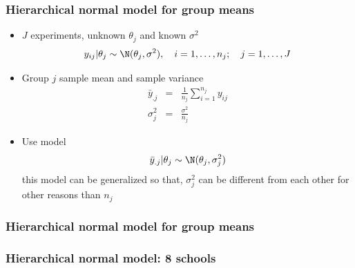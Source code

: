 \documentclass[10pt]{beamer}
\begin{document}
\begin{frame}

\frametitle{Hierarchical normal model for group means}

  \begin{itemize}
  \item $J$ experiments, unknown $\theta_j$ and known $\sigma^2$
    \begin{equation*}
      y_{ij}|\theta_j \sim \N(\theta_j,\sigma^2), \quad
      i=1,\ldots,n_j; \quad j=1,\ldots,J
    \end{equation*}
    \vspace{-6mm}
  \item Group $j$ sample mean and sample variance
    \begin{eqnarray*}
      \bar{y}_{.j} & = & \frac{1}{n_j}\sum_{i=1}^{n_j}y_{ij}\\
      \sigma_j^2 & = & \frac{\sigma^2}{n_j}
    \end{eqnarray*}
    \vspace{-6mm}
    \pause
  \item Use model
    \begin{eqnarray*}
      \bar{y}_{.j}|\theta_j \sim \N(\theta_j,\sigma_j^2)
    \end{eqnarray*}
     this model can be generalized so that, $\sigma_j^2$ can be
    different from each other for other reasons than $n_j$
  \end{itemize}
\end{frame}

\begin{frame}

\frametitle{Hierarchical normal model for group means}

    \begin{minipage}[b]{4cm}
      \begin{xy}
\end{xy}
\end{minipage}
\end{frame}

\begin{frame}

\frametitle{Hierarchical normal model: 8 schools}


\end{frame}
\end{document}
